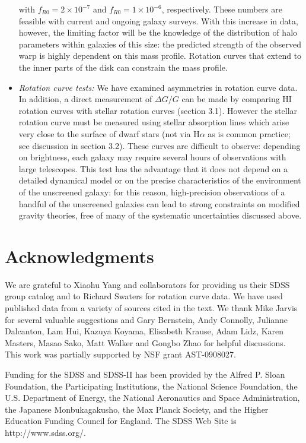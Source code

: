 \documentclass{emulateapj}
\newcommand{\ha}{H$\alpha$}
\begin{document}
\begin{itemize}
  with $f_{R0} = 2\times10^{-7}$ and $f_{R0} = 1\times10^{-6}$, respectively.
  These numbers are feasible with  current and ongoing galaxy surveys.
  With this increase in data, however, the limiting factor will be the
  knowledge of the distribution of halo parameters within galaxies of this
  size: the predicted strength of the observed warp is highly dependent on
  this mass profile. Rotation curves that extend to the inner parts of the disk
can
  constrain the mass profile. 
\item {\it  Rotation curve tests: }
  We have examined asymmetries in rotation curve data. In addition, 
  a direct measurement of $\Delta G/G$ can be made by
  comparing HI rotation curves with stellar rotation curves (section 3.1). However 
  the stellar rotation curve must be measured using stellar absorption
  lines which arise very close to the surface of dwarf stars (not via 
  \ha{} as is common practice; see discussion in section 3.2).  These curves
  are difficult to observe: depending on brightness, each galaxy may require
  several hours of observations with large telescopes. This test
  has the advantage that it does not depend on a detailed dynamical model
  or on the precise characteristics of the environment of the unscreened
  galaxy: for this reason, high-precision observations of
  a handful of the unscreened galaxies can lead to strong constraints on
  modified gravity theories, free of many of the systematic uncertainties
  discussed above.
\end{itemize}


\section{Acknowledgments}
We are grateful to Xiaohu Yang and collaborators 
for providing us their SDSS group catalog and to Richard Swaters for 
rotation curve data. We have used published data from a variety of sources
cited in the text.  
We thank Mike Jarvis for several valuable suggestions and Gary 
Bernstein, Andy Connolly, Julianne Dalcanton, Lam Hui, Kazuya Koyama, 
Elisabeth Krause, Adam Lidz, Karen Masters, Masao Sako, 
Matt Walker and Gongbo Zhao for helpful
discussions. This work was partially supported by NSF grant AST-0908027.

Funding for the SDSS and SDSS-II has been provided by the Alfred P. Sloan
Foundation, the Participating Institutions, the National Science Foundation,
the U.S. Department of Energy, the National Aeronautics and Space
Administration, the Japanese Monbukagakusho, the Max Planck Society, and the
Higher Education Funding Council for England. The SDSS Web Site is
http://www.sdss.org/.
\end{document}
